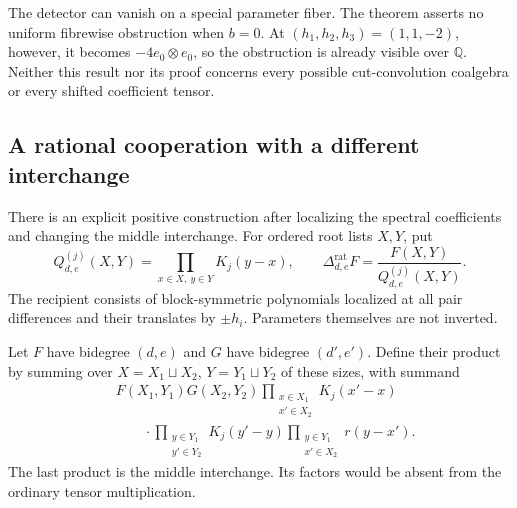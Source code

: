 The detector can vanish on a special parameter fiber.
The theorem asserts no uniform fibrewise obstruction when $b=0$.
At $(h_1,h_2,h_3)=(1,1,-2)$, however, it becomes
$-4e_0\otimes e_0$, so the obstruction is already visible over
$\mathbb Q$.
Neither this result nor its proof concerns every possible
cut-convolution coalgebra or every shifted coefficient tensor.

\subsection{A rational cooperation with a different interchange}

There is an explicit positive construction after localizing the
spectral coefficients and changing the middle interchange.
For ordered root lists $X,Y$, put
\[
 Q_{d,e}^{(j)}(X,Y)
   =\prod_{x\in X,\ y\in Y}K_j(y-x),\qquad
 \Delta_{d,e}^{\mathrm{rat}}F
   =\frac{F(X,Y)}{Q_{d,e}^{(j)}(X,Y)}.
\]
The recipient consists of block-symmetric polynomials localized
at all pair differences and their translates by $\pm h_i$.
Parameters themselves are not inverted.

Let $F$ have bidegree $(d,e)$ and $G$ have bidegree $(d',e')$.
Define their product by summing over
$X=X_1\sqcup X_2$, $Y=Y_1\sqcup Y_2$ of these sizes, with summand
\begin{equation}\label{eq:vol2-rational-interchange}
\begin{aligned}
 &F(X_1,Y_1)G(X_2,Y_2)
   \prod_{\substack{x\in X_1\\x'\in X_2}}K_j(x'-x)\\
 &\qquad\cdot
   \prod_{\substack{y\in Y_1\\y'\in Y_2}}K_j(y'-y)
   \prod_{\substack{y\in Y_1\\x'\in X_2}}r(y-x').
\end{aligned}
\end{equation}
The last product is the middle interchange.
Its factors would be absent from the ordinary tensor multiplication.

